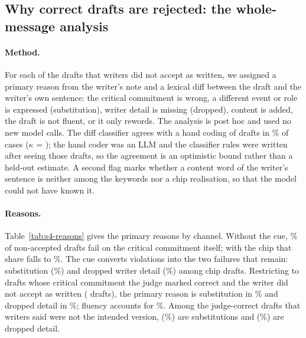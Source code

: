 \subsection{Why correct drafts are rejected: the whole-message analysis}\label{sec:whole-message}

\paragraph{Method.}
For each of the \jmwmAllNotAccN{} drafts that writers did not accept as written, we assigned a primary reason from the writer's note and a lexical diff between the draft and the writer's own sentence: the critical commitment is wrong, a different event or role is expressed (substitution), writer detail is missing (dropped), content is added, the draft is not fluent, or it only rewords.
The analysis is post hoc and used no new model calls.
The diff classifier agrees with a hand coding of \jmwmHandN{} drafts in \jmwmHandAgree{}\% of cases ($\kappa$ = \jmwmHandKappa{}); the hand coder was an LLM and the classifier rules were written after seeing those drafts, so the agreement is an optimistic bound rather than a held-out estimate.
A second flag marks whether a content word of the writer's sentence is neither among the keywords nor a chip realisation, so that the model could not have known it.

\paragraph{Reasons.}
Table~\ref{tab:s4-reasons} gives the primary reasons by channel.
Without the cue, \jmwmBareCritical{}\% of non-accepted drafts fail on the critical commitment itself; with the chip that share falls to \jmwmChipCritical{}\%.
The cue converts violations into the two failures that remain: substitution (\jmwmChipSubst{}\%) and dropped writer detail (\jmwmChipDropped{}\%) among chip drafts.
Restricting to drafts whose critical commitment the judge marked correct and the writer did not accept as written (\jmwmRightNotAccN{} drafts), the primary reason is substitution in \jmwmRightSubst{}\% and dropped detail in \jmwmRightDropped{}\%; fluency accounts for \jmwmRightFluency{}\%.
Among the \jmwmROneN{} judge-correct drafts that writers said were not the intended version, \jmwmROneSubstK{} (\jmwmROneSubst{}\%) are substitutions and \jmwmROneDroppedK{} (\jmwmROneDropped{}\%) are dropped detail.

